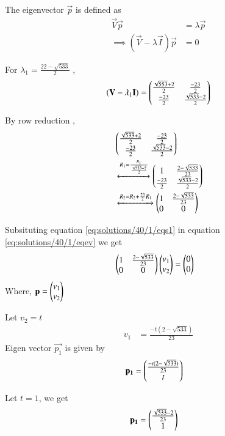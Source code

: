 The eigenvector $\vec{p}$ is defined as 
\begin{align}
    \vec{V}\vec{p}&=\lambda\vec{p}\\
    \implies (\vec{V}-\lambda\vec{I})\vec{p}&=0\label{eq:solutions/40/1/eqev}
\end{align}

For $\lambda_1=\frac{22-\sqrt{533}}{2}$ ,
\begin{align}
    (\mathbf{V}-\lambda_1\mathbf{I})=\begin{pmatrix}\frac{\sqrt{553}+2}{2} & \frac{-23}{2} \\\frac{-23}{2} & \frac{\sqrt{533}-2}{2}\end{pmatrix}
\end{align}

By row reduction , 
\begin{align}
    &\begin{pmatrix}\frac{\sqrt{533}+2}{2} & \frac{-23}{2} \\\frac{-23}{2} & \frac{\sqrt{533}-2}{2}\end{pmatrix}\\
    &\xleftrightarrow{R_1=\frac{R_1}{\frac{\sqrt{533}+2}{2}}}\begin{pmatrix}1 & \frac{2-\sqrt{533}}{23} \\\frac{-23}{2} & \frac{\sqrt{533}-2}{2}\end{pmatrix}\\
    &\xleftrightarrow{R_2=R_2+\frac{23}{2}R_1}\begin{pmatrix}1 & \frac{2-\sqrt{533}}{23} \\0 & 0\end{pmatrix}\label{eq:solutions/40/1/eqs1}
\end{align}

Subsituting equation \ref{eq:solutions/40/1/eqs1} in equation \ref{eq:solutions/40/1/eqev} we get
\begin{align}
        &\begin{pmatrix}1 & \frac{2-\sqrt{533}}{23} \\0 & 0\end{pmatrix}\begin{pmatrix}v_1 \\ v_2\end{pmatrix}=\begin{pmatrix}0 \\ 0\end{pmatrix}\label{eq:solutions/40/1/eqei1}
\end{align}
Where, $\mathbf{p}=\begin{pmatrix}v_1\\v_2\end{pmatrix}$

Let $v_2=t$
\begin{align}
    v_1&=\frac{-t(2-\sqrt{533})}{23}
\end{align}
Eigen vector $\vec{p_1}$ is given by
\begin{align}
    \mathbf{p_1}&=\begin{pmatrix}\frac{-t(2-\sqrt{533})}{23} \\ t\end{pmatrix}
\end{align}

Let $t=1$, we get
\begin{align}
        \mathbf{p_1}&=\begin{pmatrix}\frac{\sqrt{533}-2}{23} \\1 \end{pmatrix}\label{eq:solutions/40/1/eqp1}
\end{align}

